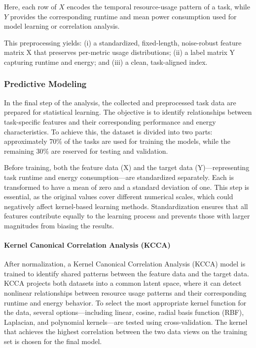Here, each row of \( X \) encodes the temporal resource-usage pattern
of a task, while \( Y \) provides the corresponding runtime and mean
power consumption used for model learning or correlation analysis.

This preprocessing yields: (i) a standardized, fixed-length, noise-robust feature matrix X that preserves per-metric usage distributions; (ii) a label matrix Y capturing runtime and energy; and (iii) a clean, task-aligned index.

\subsubsection{Predictive Modeling}
\label{sec:predictive_modeling}

In the final step of the analysis, the collected and preprocessed task data are prepared for statistical learning. The objective is to identify relationships between task-specific features and their corresponding performance and energy characteristics. To achieve this, the dataset is divided into two parts: approximately 70\% of the tasks are used for training the models, while the remaining 30\% are reserved for testing and validation.

Before training, both the feature data (X) and the target data (Y)—representing task runtime and energy consumption—are standardized separately. Each is transformed to have a mean of zero and a standard deviation of one. This step is essential, as the original values cover different numerical scales, which could negatively affect kernel-based learning methods. Standardization ensures that all features contribute equally to the learning process and prevents those with larger magnitudes from biasing the results.

\paragraph{Kernel Canonical Correlation Analysis (KCCA)}
\label{sec:kcca}
After normalization, a Kernel Canonical Correlation Analysis (KCCA) model is trained to identify shared patterns between the feature data and the target data. KCCA projects both datasets into a common latent space, where it can detect nonlinear relationships between resource usage patterns and their corresponding runtime and energy behavior. To select the most appropriate kernel function for the data, several options—including linear, cosine, radial basis function (RBF), Laplacian, and polynomial kernels—are tested using cross-validation. The kernel that achieves the highest correlation between the two data views on the training set is chosen for the final model.

